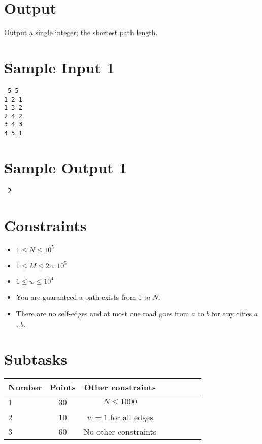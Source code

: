 \documentclass{article}
\begin{document}
\section*{Output}

Output a single integer; the shortest path length.

\begin{multicols}{2}
\section*{Sample Input 1}
{\tt
5 5\\
1 2 1\\
1 3 2\\
2 4 2\\
3 4 3\\
4 5 1
}
\columnbreak
\section*{Sample Output 1}
{\tt
2
}
\end{multicols}
\section*{Constraints}
\begin{itemize}
\item $1\leq N \leq 10^5$
\item $1 \leq M \leq 2 \times 10^5$
\item $1 \le w \le 10^4$
\item You are guaranteed a path exists from 1 to $N$.
\item There are no self-edges and at most one road goes from $a$ to $b$ for any cities $a$, $b$.
\end{itemize}

\section*{Subtasks}
\begin{tabular}{l*{6}{c}r}
Number & Points & Other constraints\\
\hline
1 & 30 & $N \le 1000$\\
2 & 10 & $w = 1$ for all edges\\
3 & 60 & No other constraints
\end{tabular}
\end{document}
